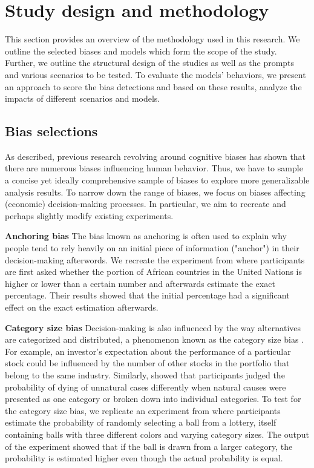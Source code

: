 \section{Study design and methodology}
\par This section provides an overview of the methodology used in this research. We outline the selected biases and models which form the scope of the study. Further, we outline the structural design of the studies as well as the prompts and various scenarios to be tested. To evaluate the models' behaviors, we present an approach to score the bias detections and based on these results, analyze the impacts of different scenarios and models.


\subsection{Bias selections}
\par As described, previous research revolving around cognitive biases has shown that there are numerous biases influencing human behavior. Thus, we have to sample a concise yet ideally comprehensive sample of biases to explore more generalizable analysis results. To narrow down the range of biases, we focus on biases affecting (economic) decision-making processes. In particular, we aim to recreate and perhaps slightly modify existing experiments.

\setlength{\parindent}{20pt}
\par \textbf{Anchoring bias} The bias known as anchoring is often used to explain why people tend to rely heavily on an initial piece of information ("anchor") in their decision-making afterwords. We recreate the experiment from \textcite{tversky1974judgment} where participants are first asked whether the portion of African countries in the United Nations is higher or lower than a certain number and afterwards estimate the exact percentage. Their results showed that the initial percentage had a significant effect on the exact estimation afterwards.

\par \textbf{Category size bias} Decision-making is also influenced by the way alternatives are categorized and distributed, a phenomenon known as the category size bias \parencite{isaac2014judging}. For example, an investor's expectation about the performance of a particular stock could be influenced by the number of other stocks in the portfolio that belong to the same industry. Similarly, \textcite{tversky1994support} showed that participants judged the probability of dying of unnatural cases differently when natural causes were presented as one category or  broken down into individual categories. To test for the category size bias, we replicate an experiment from \textcite{isaac2014judging} where participants estimate the probability of randomly selecting a ball from a lottery, itself containing balls with three different colors and varying category sizes. The output of the experiment showed that if the ball is drawn from a larger category, the probability is estimated higher even though the actual probability is equal.

